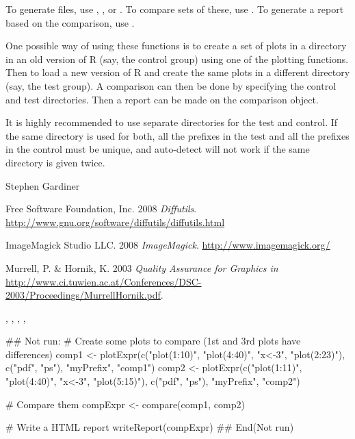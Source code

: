 \documentclass[a4paper,oneside]{report}
\begin{document}
\begin{Details}\relax
{}
To generate files, use ,
, or .
To compare sets of these, use .
To generate a report based on the comparison, use
.

One possible way of using these functions is to create a set of plots in
a directory in an old version of R (say, the control group) using one
of the plotting functions. Then to load a new version of R and create
the same plots in a different directory (say, the test group). A
comparison can then be done by specifying the control and test
directories. Then a report can be made on the comparison object.

It is highly recommended to use separate directories for the test and
control. If the same directory is used for both, all the prefixes in
the test and all the prefixes in the control must be unique, and
auto-detect will not work if the same directory is given twice.
\end{Details}
\begin{Author}\relax
Stephen Gardiner
\end{Author}
\begin{References}\relax
Free Software Foundation, Inc. 2008 \emph{Diffutils}.
\url{http://www.gnu.org/software/diffutils/diffutils.html}

ImageMagick Studio LLC. 2008 \emph{ImageMagick}.
\url{http://www.imagemagick.org/}

Murrell, P. \& Hornik, K. 2003 \emph{Quality Assurance for Graphics in \R}
\url{http://www.ci.tuwien.ac.at/Conferences/DSC-2003/Proceedings/MurrellHornik.pdf}.
\end{References}
\begin{SeeAlso}\relax
{}, ,
, ,
\end{SeeAlso}
\begin{Examples}
\begin{ExampleCode}
## Not run: 
  # Create some plots to compare (1st and 3rd plots have differences)
  comp1 <- plotExpr(c("plot(1:10)", "plot(4:40)", "x<-3", "plot(2:23)"),
                    c("pdf", "ps"), "myPrefix", "comp1")
  comp2 <- plotExpr(c("plot(1:11)", "plot(4:40)", "x<-3", "plot(5:15)"),
                    c("pdf", "ps"), "myPrefix", "comp2")

  # Compare them
  compExpr <- compare(comp1, comp2)

  # Write a HTML report
  writeReport(compExpr)
## End(Not run)
\end{ExampleCode}
\end{Examples}
\end{document}
